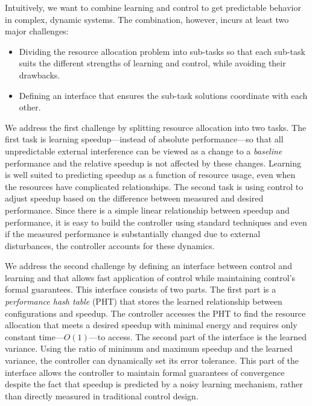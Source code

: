 Intuitively, we want to combine learning and control to get
predictable behavior in complex, dynamic systems.  The combination,
however, incurs at least two major challenges:
\begin{itemize}
\item Dividing the resource allocation problem into sub-tasks
  so that each sub-task suits the different strengths of learning and
  control, while avoiding their drawbacks.
\item Defining an interface that ensures the sub-task solutions
  coordinate with each other.
\end{itemize}

We address the first challenge by splitting resource allocation into
two tasks.  The first task is learning speedup---instead of absolute
performance---so that all unpredictable external interference can be
viewed as a change to a \emph{baseline} performance and the relative
speedup is not affected by these changes.  Learning is well suited to
predicting speedup as a function of resource usage, even when the
resources have complicated relationships.  The second task is using
control to adjust speedup based on the difference between measured and
desired performance. Since there is a simple linear relationship
between speedup and performance, it is easy to build the controller
using standard techniques and even if the measured performance is
substantially changed due to external disturbances, the controller
accounts for these dynamics.

We address the second challenge by defining an interface between
control and learning and that allows fast application of control while
maintaining control's formal guarantees.  This interface consists of
two parts.  The first part is a \emph{performance hash table} (PHT)
that stores the learned relationship between configurations and
speedup.  The controller accesses the PHT to find the resource
allocation that meets a desired speedup with minimal energy and
requires only constant time---$O(1)$---to access.  The second part of
the interface is the learned variance.  Using the ratio of minimum and
maximum speedup and the learned variance, the controller can
dynamically set its error tolerance.  This part of the interface
allows the controller to maintain formal guarantees of convergence
despite the fact that speedup is predicted by a noisy learning
mechanism, rather than directly measured in traditional control
design.

